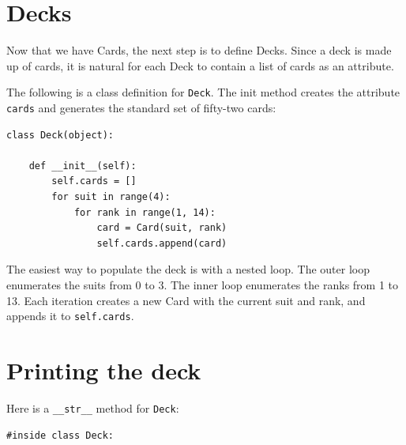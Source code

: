 \documentclass[10pt]{book}
\begin{document}
{\begin{ex}

\end{ex}


\section{Decks}

Now that we have Cards, the next step is to define Decks.  Since a
deck is made up of cards, it is natural for each Deck to contain a
list of cards as an attribute.


The following is a class definition for {\tt Deck}.  The
init method creates the attribute {\tt cards} and generates
the standard set of fifty-two cards:



\beforeverb
\begin{verbatim}
class Deck(object):

    def __init__(self):
        self.cards = []
        for suit in range(4):
            for rank in range(1, 14):
                card = Card(suit, rank)
                self.cards.append(card)
\end{verbatim}
\afterverb
%
The easiest way to populate the deck is with a nested loop.  The outer
loop enumerates the suits from 0 to 3.  The inner loop enumerates the
ranks from 1 to 13.  Each iteration
creates a new Card with the current suit and rank,
and appends it to {\tt self.cards}.



\section{Printing the deck}
\label{printdeck}


Here is a \verb"__str__" method for {\tt Deck}:

\beforeverb
\begin{verbatim}
#inside class Deck:


\end{verbatim}}
\end{document}
